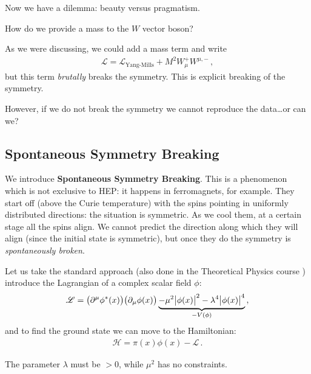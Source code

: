 \documentclass[main.tex]{subfiles}
\begin{document}

Now we have a dilemma: beauty versus pragmatism.

How do we provide a mass to the \(W\) vector boson?


As we were discussing, we could add a mass term and write 
%
\begin{align}
\mathscr{L} = \mathscr{L} _{\text{Yang-Mills}} + M^2 W^{+}_{\mu } W^{\mu, -}
\,,
\end{align}
%
but this term \emph{brutally} breaks the symmetry.
This is explicit breaking of the symmetry. 

However, if we do not break the symmetry we cannot reproduce the data\dots or can we?

\subsection{Spontaneous Symmetry Breaking}

We introduce \textbf{Spontaneous Symmetry Breaking}. 
This is a phenomenon which is not exclusive to HEP: it happens in ferromagnets, for example.
They start off (above the Curie temperature) with the spins pointing in uniformly distributed directions: the situation is symmetric.
As we cool them, at a certain stage all the spins align.
We cannot predict the direction along which they will align (since the initial state is symmetric), but once they do the symmetry is \emph{spontaneously broken}.

Let us take the standard approach (also done in the Theoretical Physics course \cite[sec.\ 5.2]{tissinoTheoreticalPhysicsNotes2020}) introduce the Lagrangian of a complex scalar field \(\phi \): 
%
\begin{align}
\mathscr{L} = \qty(\partial^{\mu  } \phi^{*}(x)) \qty(\partial_{\mu } \phi (x)) 
\underbrace{- \mu^2 \abs{\phi (x)}^2
- \lambda^{4} \abs{\phi (x)}^{4}}_{- V(\phi )}
\,,
\end{align}
%
and to find the ground state we can move to the Hamiltonian: 
%
\begin{align}
\mathscr{H} = \pi(x) \phi (x) - \mathscr{L}
\,.
\end{align}

The parameter \(\lambda \) must be \(>0\), while \(\mu^2\) has no constraints.
\end{document}
